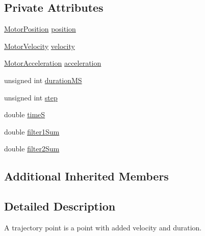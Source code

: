 \subsection*{Private Attributes}
\begin{DoxyCompactItemize}
\item 
\hyperlink{classMotorPosition}{Motor\-Position} \hyperlink{classTrajectoryPoint_a786f988c05632066d9759cf23c1b1ddf}{position}
\item 
\hyperlink{classMotorVelocity}{Motor\-Velocity} \hyperlink{classTrajectoryPoint_ab8782cac9ee57c49096bd94611b4d2d2}{velocity}
\item 
\hyperlink{classMotorAcceleration}{Motor\-Acceleration} \hyperlink{classTrajectoryPoint_a7633f742dd289ebbcfe09286b3840d96}{acceleration}
\item 
unsigned int \hyperlink{classTrajectoryPoint_a7e6ba8249d02b309129ea6f190ff296f}{duration\-M\-S}
\item 
unsigned int \hyperlink{classTrajectoryPoint_a11f7fb0c8a2742c89c761bc807ec6b2e}{step}
\item 
double \hyperlink{classTrajectoryPoint_a25fe1578e301cba61b31921ec98f7349}{time\-S}
\item 
double \hyperlink{classTrajectoryPoint_a98e19176c99793e4fa45f6d117878ed0}{filter1\-Sum}
\item 
double \hyperlink{classTrajectoryPoint_a384166e1e0967cdc00572418826799db}{filter2\-Sum}
\end{DoxyCompactItemize}
\subsection*{Additional Inherited Members}


\subsection{Detailed Description}
A trajectory point is a point with added velocity and duration. 

